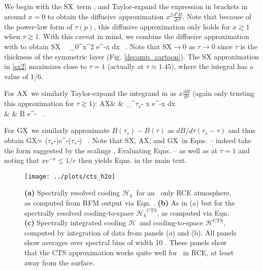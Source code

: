\documentclass[10pt]{article}
\newcommand{\ch}{\ensuremath{\mathcal{H}}}
\newcommand{\chk}{\ensuremath{\ch_k}}
\newcommand{\taus}{\ensuremath{\tau_s}}
\newcommand{\SX}{\ensuremath{\mathrm{SX}}}
\newcommand{\AX}{\ensuremath{\mathrm{AX}}}
\newcommand{\GX}{\ensuremath{\mathrm{GX}}}
\newcommand{\CTS}{\ensuremath{\mathrm{CTS}}}
\begin{document}
We begin with the \SX\ term , and Taylor-expand the expression in brackets in  around $x=0$ to obtain the diffusive approximation $x^2\frac{d^2 B}{d \tau^2}$. Note that because of the power-law form of $\tau(p)$, this diffusive approximation only holds for $x\gtrsim 1$ when $\tau\gtrsim 1$. With this caveat in mind,  we combine the diffusive approximation with  to obtain
\beqn
 	\SX  \ \approx \     \int_0^\tau x^2 e^{-x} dx \ .
	\label{sx3}
\eeqn
Note that $\SX \rightarrow 0$ as $\tau\rightarrow 0$ since $\tau$ is the thickness of the symmetric layer (Fig. \ref{decomp_cartoon}). The SX  approximation in \eqref{sx2}  maximizes close to $\tau=1$ (actually at $\tau\approx 1.45$), where the integral has a value of 1/6. 

 For \AX\ we similarly Taylor-expand the integrand in  as $x\frac{d B}{d \tau}$ (again only trusting this approximation for  $\tau \gtrsim 1$):
\beqa
 	\AX &  \approx  &     \int_\tau^{\taus - \tau} x e^{-x} dx \n 	  \\
		   &  \approx  & \gamma {}B e^{-\tau}  \ . \label{ax3} 
\eeqa

For \GX\  we similarly approximate $B(\taus) - B(\tau)$ as $dB/d\tau (\taus-\tau)$ and thus obtain
\beqn
	\GX  =    (\taus-\tau)e^{-(\taus-\tau)}  \ .
	\label{gx2}
\eeqn
Note that \SX, \AX, and \GX\  in  Eqns.  --  indeed take the form suggested by the scalings . Evaluating Eqns.  --  as well as   at $\tau=1$ and noting that $xe^{-x}\leq 1/e$ then yields Eqns.  in the main text.

\pagebreak

\begin{figure}[h]
	\begin{center}
			\texttt{[image: ../plots/cts\_h2o]}
		\caption{ \textbf{(a)} Spectrally resolved cooling \chk\ for an \htwo\ only RCE atmosphere, as computed from RFM output via Eqn. . 
	  				  \textbf{(b)} As in (a) but for the spectrally resolved cooling-to-space $\chk^{\CTS}$, as computed  via Eqn. 
					  \textbf{(c)} Spectrally integrated cooling \ch\ and cooling-to-space $\ch^{\CTS}$, computed by integration of data from panels (a) and (b).
					  All panels show averages over spectral bins of width 10 \cminverse. These panels show that the CTS approximation works quite well for \htwo\ in RCE, at least away from the surface.
		\label{cts_h2o}
		}
	\end{center}
\end{figure}
\end{document}
